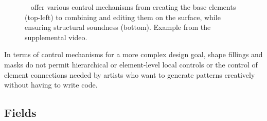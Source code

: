\begin{figure}[H]
    \centering
    \caption{\label{fig:zehnder_2016_dso}\citeauthor*{zehnder_2016_dso}~\cite{zehnder_2016_dso} offer various control mechanisms from creating the base elements (top-left) to combining and editing them on the surface, while ensuring structural soundness (bottom). Example from the supplemental video. \color{orange}{Status rights: Disney?}}
\end{figure}

In terms of control mechanisms for a more complex design goal, shape fillings and masks do not permit hierarchical or element-level local controls or the control of element connections needed by artists who want to generate patterns creatively without having to write code.


\subsection{Fields}
\label{subsubsec:analysis_creative_means_fields}

